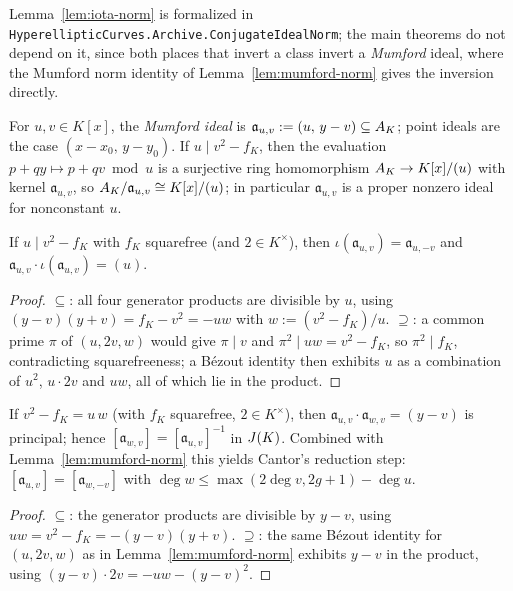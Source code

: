 \begin{remark}[Formalization]
Lemma~\ref{lem:iota-norm} is formalized in
\texttt{HyperellipticCurves.Archive.ConjugateIdealNorm}; the main theorems do not depend on it,
since both places that invert a class invert a \emph{Mumford} ideal, where the Mumford norm
identity of Lemma~\ref{lem:mumford-norm} gives the inversion directly.
\end{remark}

\begin{definition}
\label{def:mumford-ideal}
\leanok
{}
For $u, v \in K[x]$, the \emph{Mumford ideal} is
$\mathfrak a_{u,v} := (u,\, y - v) \subseteq A_{K}$; point ideals are the case
$(x - x_0,\, y - y_0)$. If $u \mid v^2 - f_K$, then the evaluation
$p + qy \mapsto p + qv \bmod u$ is a surjective ring homomorphism
$A_{K} \to K[x]/(u)$ with kernel $\mathfrak a_{u,v}$, so
$A_{K}/\mathfrak a_{u,v} \cong K[x]/(u)$; in particular $\mathfrak a_{u,v}$ is a
proper nonzero ideal for nonconstant $u$.
\end{definition}

\begin{lemma}
\label{lem:mumford-norm}
\leanok
{}
If $u \mid v^2 - f_K$ with $f_K$ squarefree (and $2 \in K^\times$), then
$\iota(\mathfrak a_{u,v}) = \mathfrak a_{u,-v}$ and
$\mathfrak a_{u,v} \cdot \iota(\mathfrak a_{u,v}) = (u)$.
\end{lemma}
\begin{proof}
\leanok
$\subseteq$: all four generator products are divisible by $u$, using
$(y-v)(y+v) = f_K - v^2 = -uw$ with $w := (v^2-f_K)/u$. $\supseteq$: a common prime $\pi$
of $(u, 2v, w)$ would give $\pi \mid v$ and $\pi^2 \mid uw = v^2 - f_K$, so
$\pi^2 \mid f_K$, contradicting squarefreeness; a B\'ezout identity then exhibits $u$ as
a combination of $u^2$, $u\cdot 2v$ and $uw$, all of which lie in the product.
\end{proof}

\begin{lemma}
\label{lem:mumford-divisor-y}
\leanok
{}
If $v^2 - f_K = u\,w$ (with $f_K$ squarefree, $2 \in K^\times$), then
$\mathfrak a_{u,v} \cdot \mathfrak a_{w,v} = (y - v)$ is principal; hence
$[\mathfrak a_{w,v}] = [\mathfrak a_{u,v}]^{-1}$ in $J(K)$. Combined with
Lemma~\ref{lem:mumford-norm} this yields Cantor's reduction step:
$[\mathfrak a_{u,v}] = [\mathfrak a_{w,-v}]$ with
$\deg w \le \max(2\deg v, 2g+1) - \deg u$.
\end{lemma}
\begin{proof}
\leanok
$\subseteq$: the generator products are divisible by $y - v$, using
$uw = v^2 - f_K = -(y-v)(y+v)$. $\supseteq$: the same B\'ezout identity for
$(u, 2v, w)$ as in Lemma~\ref{lem:mumford-norm} exhibits $y - v$ in the product,
using $(y-v)\cdot 2v = -uw - (y-v)^2$.
\end{proof}

